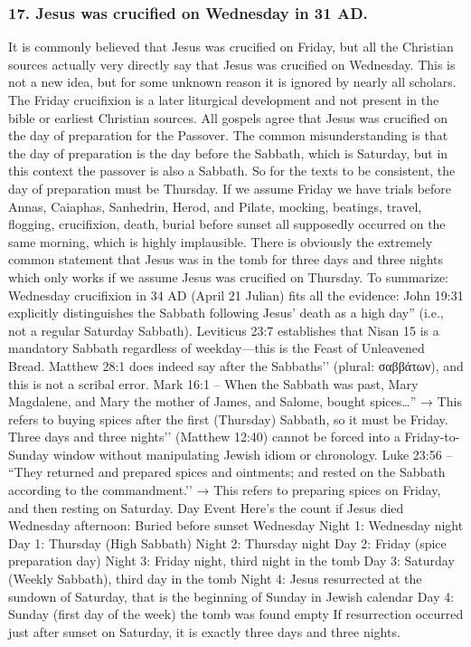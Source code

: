 \subsubsection{17.
Jesus was crucified on Wednesday in 31 AD.}\label{subsubsec:jesus-was-crucified-on-wednesday-in-31-ad.}
It is commonly believed that Jesus was crucified on Friday, but all the Christian sources actually very directly say that Jesus was crucified on Wednesday.
This is not a new idea, but for some unknown reason it is ignored by nearly all scholars.
The Friday crucifixion is a later liturgical development and not present in the bible or earliest Christian sources.
All gospels agree that Jesus was crucified on the day of preparation for the Passover.
The common misunderstanding is that the day of preparation is the day before the Sabbath, which is Saturday, but in this context the passover is also a Sabbath.
So for the texts to be consistent, the day of preparation must be Thursday.
If we assume Friday we have trials before Annas, Caiaphas, Sanhedrin, Herod, and Pilate, mocking, beatings, travel, flogging, crucifixion, death, burial before sunset all supposedly occurred on the same morning, which is highly implausible.
There is obviously the extremely common statement that Jesus was in the tomb for three days and three nights which only works if we assume Jesus was crucified on Thursday.
To summarize: Wednesday crucifixion in 34 AD (April 21 Julian) fits all the evidence: John 19:31 explicitly distinguishes the Sabbath following Jesus’ death as a high day'' (i.e., not a regular Saturday Sabbath).
Leviticus 23:7 establishes that Nisan 15 is a mandatory Sabbath regardless of weekday---this is the Feast of Unleavened Bread.
Matthew 28:1 does indeed say after the Sabbaths’’ (plural: σαββάτων), and this is not a scribal error.
Mark 16:1 – When the Sabbath was past, Mary Magdalene, and Mary the mother of James, and Salome, bought spices\ldots'' → This refers to buying spices after the first (Thursday) Sabbath, so it must be Friday.
Three days and three nights’’ (Matthew 12:40) cannot be forced into a Friday-to-Sunday window without manipulating Jewish idiom or chronology.
Luke 23:56 – ``They returned and prepared spices and ointments; and rested on the Sabbath according to the commandment.’’ → This refers to preparing spices on Friday, and then resting on Saturday.
Day Event Here’s the count if Jesus died Wednesday afternoon: Buried before sunset Wednesday Night 1: Wednesday night Day 1: Thursday (High Sabbath) Night 2: Thursday night Day 2: Friday (spice preparation day) Night 3: Friday night, third night in the tomb Day 3: Saturday (Weekly Sabbath), third day in the tomb Night 4: Jesus resurrected at the sundown of Saturday, that is the beginning of Sunday in Jewish calendar Day 4: Sunday (first day of the week) the tomb was found empty If resurrection occurred just after sunset on Saturday, it is exactly three days and three nights.
